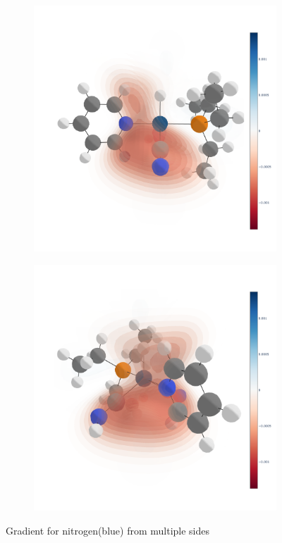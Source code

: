 \begin{figure}
  \medskip

  \begin{subfigure}[t]{.5\textwidth}
    \centering
    \includegraphics[width=\linewidth]{figures/evaluation/elem2-N-SIDE.png}
  \end{subfigure}
  \hfill
  \begin{subfigure}[t]{.5\textwidth}
    \centering
    \includegraphics[width=\linewidth]{figures/evaluation/elem2-N-BACK.png}
  \end{subfigure}
  \caption{Gradient for nitrogen(blue) from multiple sides}
  \label{fig:gradient-sides}
\end{figure}


